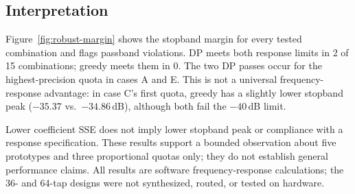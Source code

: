 \subsection{Interpretation}

Figure~\ref{fig:robust-margin} shows the stopband margin for every tested
combination and flags passband violations. DP meets both response limits
in 2 of 15 combinations; greedy meets
them in 0. The two DP passes occur for the highest-precision quota in
cases A and E. This is not a universal frequency-response advantage:
in case C's first quota, greedy has a slightly lower stopband peak
($-35.37$ vs.\ $-34.86$\,dB), although both fail the $-40$\,dB limit.

Lower coefficient SSE does not imply lower stopband peak or compliance
with a response specification. These results support a bounded
observation about five prototypes and three proportional quotas only;
they do not establish general performance claims. All results are
software frequency-response calculations; the 36- and 64-tap designs
were not synthesized, routed, or tested on hardware.

